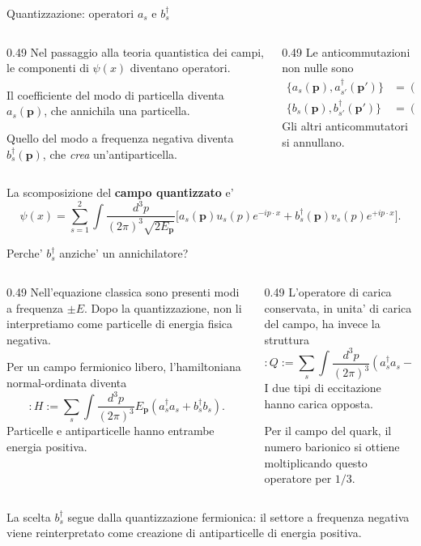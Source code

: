 \begin{frame}{Quantizzazione: operatori $a_s$ e $b_s^\dagger$}
\small
\begin{columns}[T,onlytextwidth]
\begin{column}{0.49\textwidth}
Nel passaggio alla teoria quantistica dei campi,
le componenti di $\psi(x)$ diventano operatori.

Il coefficiente del modo di particella diventa
$a_s(\mathbf p)$, che annichila una particella.

Quello del modo a frequenza negativa diventa
$b_s^\dagger(\mathbf p)$, che \emph{crea} un'antiparticella.
\end{column}
\begin{column}{0.49\textwidth}
Le anticommutazioni non nulle sono
\[
 \begin{aligned}
 \{a_s(\mathbf p),a_{s'}^\dagger(\mathbf p')\}
 &=(2\pi)^3\delta_{ss'}\delta^3(\mathbf p-\mathbf p'),\\
 \{b_s(\mathbf p),b_{s'}^\dagger(\mathbf p')\}
 &=(2\pi)^3\delta_{ss'}\delta^3(\mathbf p-\mathbf p').
 \end{aligned}
\]
Gli altri anticommutatori si annullano.
\end{column}
\end{columns}
\medskip
La scomposizione del \textbf{campo quantizzato} e'
\[
 \psi(x)=\sum_{s=1}^{2}\int\frac{d^3p}{(2\pi)^3\sqrt{2E_{\mathbf p}}}
 \bigl[a_s(\mathbf p)u_s(p)e^{-ip\cdot x}
 +b_s^\dagger(\mathbf p)v_s(p)e^{+ip\cdot x}\bigr].
\]
\end{frame}

\begin{frame}{Perche' $b_s^\dagger$ anziche' un annichilatore?}
\small
\begin{columns}[T,onlytextwidth]
\begin{column}{0.49\textwidth}
Nell'equazione classica sono presenti modi a
frequenza $\pm E$. Dopo la quantizzazione, non
li interpretiamo come particelle di energia fisica negativa.

Per un campo fermionico libero, l'hamiltoniana
normal-ordinata diventa
\[
 :H:=\sum_s\int\!\frac{d^3p}{(2\pi)^3}
 E_{\mathbf p}(a_s^\dagger a_s+b_s^\dagger b_s).
\]
Particelle e antiparticelle hanno entrambe energia positiva.
\end{column}
\begin{column}{0.49\textwidth}
L'operatore di carica conservata, in unita' di
carica del campo, ha invece la struttura
\[
 :Q:=\sum_s\int\!\frac{d^3p}{(2\pi)^3}
 (a_s^\dagger a_s-b_s^\dagger b_s).
\]
I due tipi di eccitazione hanno carica opposta.

Per il campo del quark, il numero barionico
si ottiene moltiplicando questo operatore per $1/3$.
\end{column}
\end{columns}
\medskip
La scelta $b_s^\dagger$ segue dalla quantizzazione fermionica:
il settore a frequenza negativa viene reinterpretato come
creazione di antiparticelle di energia positiva.
\end{frame}

